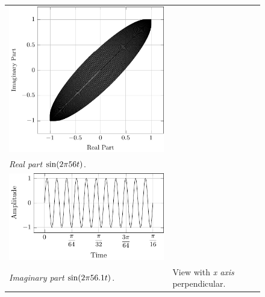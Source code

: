 \documentclass[../../course]{subfiles}
\begin{document}
\begin{figure} [H]
\begin{NiceTabularX} {\textwidth} {
            *{2}{>{\centering\arraybackslash}X}
        }
         {
             {
                \includegraphics[height = \textheight] {tikzpics/plotFrontViewComplexF.pdf}
            }
        }

        \\

         {\emph{Real part} $\sin(2 \pi 56 t)$.}
        \label{plt:realCmplxF}

        &
        \\

         {
             {
                \includegraphics[height = \textheight] {tikzpics/plotShortX3.pdf}
            }
        }

        &
        \\

         {\emph{Imaginary part} $\sin(2 \pi 56.1 t)$.}
        \label{plt:imagCmplxF}

        &

         {View with \emph{x axis} perpendicular.}
        \label{plt:frontViewCmplxF}

        \\

    \end{NiceTabularX}

\end{figure}
\end{document}
